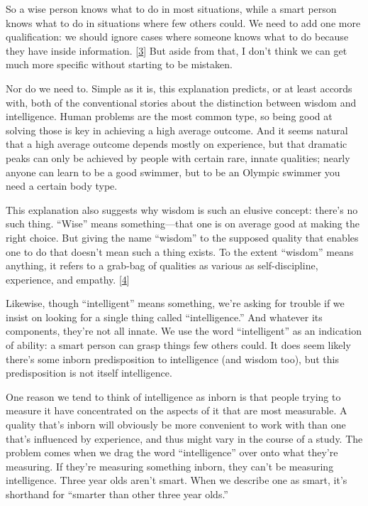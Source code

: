So a wise person knows what to do in most situations, while a smart
person knows what to do in situations where few others could. We need to
add one more qualification: we should ignore cases where someone knows
what to do because they have inside information. {[}\hyperref[f3n]{3}{]}
But aside from that, I don't think we can get much more specific without
starting to be mistaken.

Nor do we need to. Simple as it is, this explanation predicts, or at
least accords with, both of the conventional stories about the
distinction between wisdom and intelligence. Human problems are the most
common type, so being good at solving those is key in achieving a high
average outcome. And it seems natural that a high average outcome
depends mostly on experience, but that dramatic peaks can only be
achieved by people with certain rare, innate qualities; nearly anyone
can learn to be a good swimmer, but to be an Olympic swimmer you need a
certain body type.

This explanation also suggests why wisdom is such an elusive concept:
there's no such thing. ``Wise'' means something---that one is on average
good at making the right choice. But giving the name ``wisdom'' to the
supposed quality that enables one to do that doesn't mean such a thing
exists. To the extent ``wisdom'' means anything, it refers to a grab-bag
of qualities as various as self-discipline, experience, and empathy.
{[}\hyperref[f4n]{4}{]}

Likewise, though ``intelligent'' means something, we're asking for
trouble if we insist on looking for a single thing called
``intelligence.'' And whatever its components, they're not all innate.
We use the word ``intelligent'' as an indication of ability: a smart
person can grasp things few others could. It does seem likely there's
some inborn predisposition to intelligence (and wisdom too), but this
predisposition is not itself intelligence.

One reason we tend to think of intelligence as inborn is that people
trying to measure it have concentrated on the aspects of it that are
most measurable. A quality that's inborn will obviously be more
convenient to work with than one that's influenced by experience, and
thus might vary in the course of a study. The problem comes when we drag
the word ``intelligence'' over onto what they're measuring. If they're
measuring something inborn, they can't be measuring intelligence. Three
year olds aren't smart. When we describe one as smart, it's shorthand
for ``smarter than other three year olds.''


